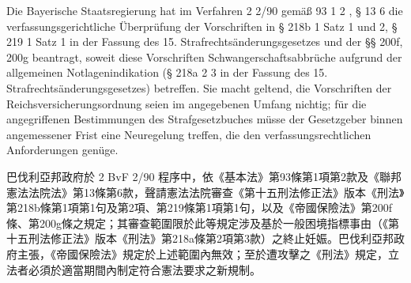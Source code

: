 \documentclass[12pt]{article}
\begin{document}
\begin{sourcepara}[title={原文理由 B.I 開頭}]
Die Bayerische Staatsregierung hat im Verfahren 2 \abbrBvF{} 2/90 gemäß \abbrArt{} 93 \abbrAbs{} 1 \abbrNr{} 2 \abbrGG{}\ggfnArtNinetyThreeOneTwoDE{}, § 13 \abbrNr{} 6 \abbrBVerfGG{} die verfassungsgerichtliche Überprüfung der Vorschriften in § 218b \abbrAbs{} 1 Satz 1 und \abbrAbs{} 2, § 219 \abbrAbs{} 1 Satz 1 \abbrStGB{} in der Fassung des 15. Strafrechtsänderungsgesetzes und der §§ 200f, 200g \abbrRVO{} beantragt, soweit diese Vorschriften Schwangerschaftsabbrüche aufgrund der allgemeinen Notlagenindikation (§ 218a \abbrAbs{} 2 \abbrNr{} 3 \abbrStGB{} in der Fassung des 15. Strafrechtsänderungsgesetzes) betreffen. Sie macht geltend, die Vorschriften der Reichsversicherungsordnung seien im angegebenen Umfang nichtig; für die angegriffenen Bestimmungen des Strafgesetzbuches müsse der Gesetzgeber binnen angemessener Frist eine Neuregelung treffen, die den verfassungsrechtlichen Anforderungen genüge.
\end{sourcepara}
\begin{transpara}
巴伐利亞邦政府於 2 BvF 2/90 程序中，依《基本法》第93條第1項\ggfnArtNinetyThreeOneTwoZH{}第2款及《聯邦憲法法院法》第13條第6款，聲請憲法法院審查《第十五刑法修正法》版本《刑法》第218b條第1項第1句及第2項、第219條第1項第1句，以及《帝國保險法》第200f條、第200g條之規定；其審查範圍限於此等規定涉及基於一般困境指標事由（《第十五刑法修正法》版本《刑法》第218a條第2項第3款）之終止妊娠。巴伐利亞邦政府主張，《帝國保險法》規定於上述範圍內無效；至於遭攻擊之《刑法》規定，立法者必須於適當期間內制定符合憲法要求之新規制。
\end{transpara}
\end{document}

